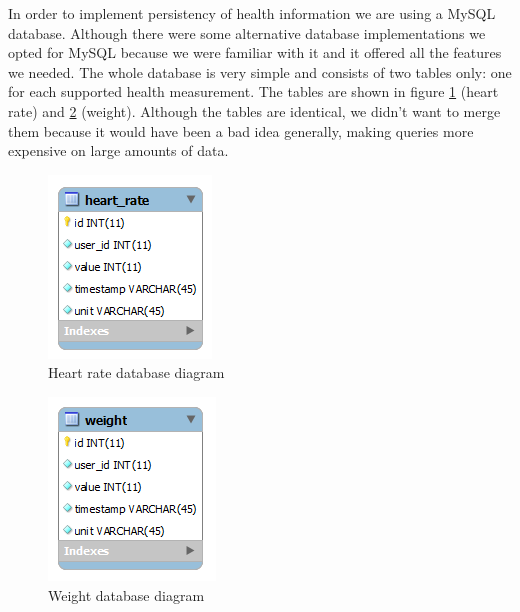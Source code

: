 In order to implement persistency of health information we are using a MySQL database.
Although there were some alternative database implementations we opted for MySQL
because we were familiar with it and it offered all the features we needed.
The whole database is very simple and consists of two tables only: one for each supported health measurement.
The tables are shown in figure \ref{figure:heart-rate-database-diagram} (heart rate)
and \ref{figure:weight-database-diagram} (weight).
Although the tables are identical, we didn't want to merge them because it would 
have been a bad idea generally, making queries more expensive on large amounts of data.


\begin{figure}[h]
\centering
\includegraphics[scale=1.0]{../Figures/heart-rate-database-diagram.png}
\caption{Heart rate database diagram}
\label{figure:heart-rate-database-diagram}
\end{figure}

\begin{figure}[h]
\centering
\includegraphics[scale=1.0]{../Figures/weight-database-diagram.png}
\caption{Weight database diagram}
\label{figure:weight-database-diagram}
\end{figure}

